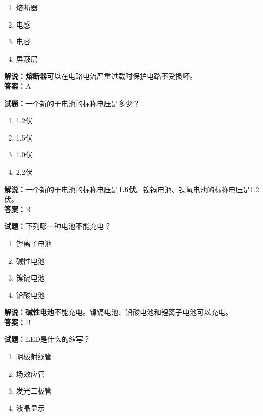 \documentclass{ctexbook}
\begin{document}
\begin{enumerate}[leftmargin=3em]
  \item 熔断器
  \item 电感
  \item 电容
  \item 屏蔽层
\end{enumerate}

\noindent\textbf{解说：熔断器}可以在电路电流严重过载时保护电路不受损坏。\\\noindent\textbf{答案：}A
\vspace{\baselineskip}

\noindent\textbf{试题：}一个新的干电池的标称电压是多少？

\begin{enumerate}[leftmargin=3em]
  \item \num{1.2}伏
  \item \num{1.5}伏
  \item \num{1.0}伏
  \item \num{2.2}伏
\end{enumerate}

\noindent\textbf{解说：}一个新的干电池的标称电压是\textbf{\num{1.5}伏}。镍镉电池、镍氢电池的标称电压是\num{1.2}伏。\\\noindent\textbf{答案：}B

\vspace{\baselineskip}

\noindent\textbf{试题：}下列哪一种电池不能充电？

\begin{enumerate}[leftmargin=3em]
  \item 锂离子电池
  \item 碱性电池
  \item 镍镉电池
  \item 铅酸电池
\end{enumerate}

\noindent\textbf{解说：碱性电池}不能充电。镍镉电池、铅酸电池和锂离子电池可以充电。\\\noindent\textbf{答案：}B
\vspace{\baselineskip}

\noindent\textbf{试题：}LED是什么的缩写？

\begin{enumerate}[leftmargin=3em]
  \item 阴极射线管
  \item 场效应管
  \item 发光二极管
  \item 液晶显示
\end{enumerate}
\end{document}
